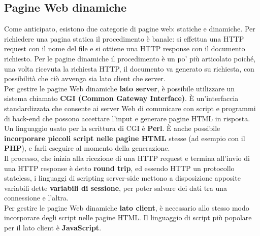     \subsection{Pagine Web dinamiche}
        Come anticipato, esistono due categorie di pagine web: statiche e dinamiche. Per richiedere una
        pagina statica il procedimento è banale: si effettua una HTTP request con il nome del file e si
        ottiene una HTTP response con il documento richiesto. Per le pagine dinamiche il procedimento
        è un po’ più articolato poiché, una volta ricevuta la richiesta HTTP, il documento va generato su
        richiesta, con possibilità che ciò avvenga sia lato client che server.\\

        Per gestire le pagine Web dinamiche \textbf{lato server}, è possibile utilizzare un sistema chiamato \textbf{CGI
        (Common Gateway Interface)}. È un’interfaccia standardizzata che consente ai server Web di
        comunicare con script e programmi di back-end che possono accettare l’input e generare
        pagine HTML in risposta. Un linguaggio usato per la scrittura di CGI è \textbf{Perl}. È anche possibile
        \textbf{incorporare piccoli script nelle pagine HTML} stesse (ad esempio con il \textbf{PHP}), e farli eseguire
        al momento della generazione.\\

        Il processo, che inizia alla ricezione di una HTTP request e termina all’invio di una HTTP
        response è detto \textbf{round trip}, ed essendo HTTP un protocollo stateless, i linguaggi di scripting
        server-side mettono a disposizione apposite variabili dette \textbf{variabili di sessione}, per poter
        salvare dei dati tra una connessione e l’altra.\\

        Per gestire le pagine Web dinamiche \textbf{lato client}, è necessario allo stesso modo incorporare
        degli script nelle pagine HTML. Il linguaggio di script più popolare per il lato client è \textbf{JavaScript}.